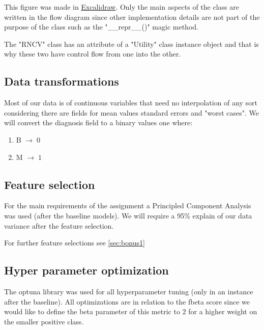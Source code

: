 \documentclass[12pt, a4paper]{article}
\begin{document}
\begin{multicols}{2}

    This figure was made in \href{https://excalidraw.com}{Excalidraw}. Only the main aspects of the class are written in the flow diagram since other implementation details are not part of the purpose of the class such as the "\_\_repr\_\_()" magic method.
    \newline

    The "RNCV" class has an attribute of a "Utility" class instance object and that is why these two have control flow from one into the other.
    \newline

    \subsection{Data transformations} \label{subsec:transforms}

    Most of our data is of continuous variables that need no interpolation of any sort considering there are fields for mean values standard errors and "worst cases". We will convert the diagnosis field to a binary values one where:
    \newline

    \begin{enumerate} \label{enm:casting}
        \item B $\rightarrow \; 0$
        \item M $\rightarrow \; 1$
    \end{enumerate}

    \subsection{Feature selection} \label{subsec:fselect}

    For the main requirements of the assignment a Principled Component Analysis was used (after the baseline models). We will require a 95\% explain of our data variance after the feature selection.
    \newline

    For further feature selections see \ref{sec:bonus1}
    \newline

    \subsection{Hyper parameter optimization} \label{subsec:optuna}

    The optuna library \cite{noauthor_optuna_nodate} was used for all hyperparameter tuning (only in an instance after the baseline). All optimizations are in relation to the fbeta score since we would like to define the beta parameter of this metric to $2$ for a higher weight on the smaller positive class.
    \newline


\end{multicols}
\end{document}
